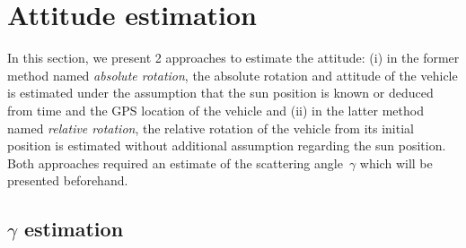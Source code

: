 \graphicspath{{./content/intro/figures/}}

\section{Attitude estimation}
\label{sec:g-abs-rel}

In this section, we present 2 approaches to estimate the attitude: (i) in the
former method named \emph{absolute rotation}, the absolute rotation and
attitude of the vehicle is estimated under the assumption that the sun position
is known or deduced from time and the GPS location of the vehicle and (ii) in
the latter method named \emph{relative rotation}, the relative rotation of the
vehicle from its initial position is estimated without additional assumption
regarding the sun position. Both approaches required an estimate of the
scattering angle~$\gamma$ which will be presented beforehand.


\subsection{$\gamma$ estimation}
\label{sec:gamma}

